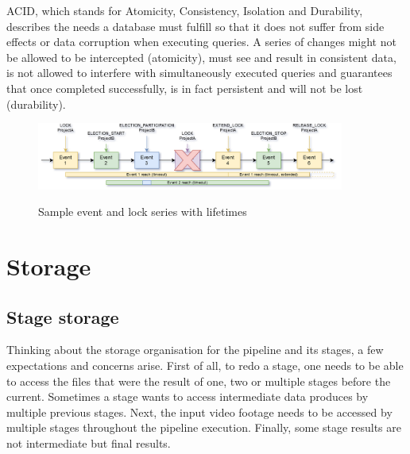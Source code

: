 ACID, which stands for Atomicity, Consistency, Isolation and Durability, describes the needs a database must fulfill so that it does not suffer from side effects or data corruption when executing queries.
A series of changes might not be allowed to be intercepted (atomicity), must see and result in consistent data, is not allowed to interfere with simultaneously executed queries and guarantees that once completed successfully, is in fact persistent and will not be lost (durability).




\begin{figure}[h]
	\includegraphics[width=0.9\textwidth]{events.png}
	\label{winslow:com:events}
	\caption{Sample event and lock series with lifetimes}
\end{figure}









\section{Storage}

\subsection{Stage storage}


Thinking about the storage organisation for the pipeline and its stages, a few expectations and concerns arise.
First of all, to redo a stage, one needs to be able to access the files that were the result of one, two or multiple stages before the current.
Sometimes a stage wants to access intermediate data produces by multiple previous stages.
Next, the input video footage needs to be accessed by multiple stages throughout the pipeline execution.
Finally, some stage results are not intermediate but final results.

